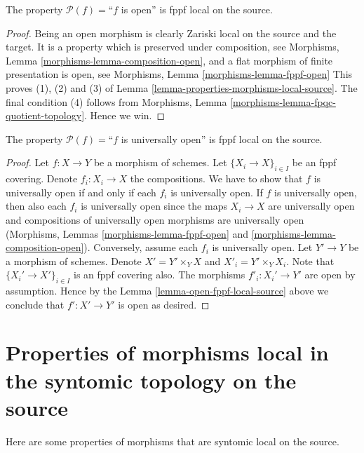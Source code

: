 \begin{lemma}
\label{lemma-open-fppf-local-source}
The property $\mathcal{P}(f)=$``$f$ is open''
is fppf local on the source.
\end{lemma}

\begin{proof}
Being an open morphism is clearly Zariski local on the source and the target.
It is a property which is preserved under composition, see
Morphisms, Lemma \ref{morphisms-lemma-composition-open}, and
a flat morphism of finite presentation is open, see
Morphisms, Lemma \ref{morphisms-lemma-fppf-open}
This proves
(1), (2) and (3) of Lemma \ref{lemma-properties-morphisms-local-source}.
The final condition (4) follows from
Morphisms, Lemma \ref{morphisms-lemma-fpqc-quotient-topology}.
Hence we win.
\end{proof}

\begin{lemma}
\label{lemma-universally-open-fppf-local-source}
The property $\mathcal{P}(f)=$``$f$ is universally open''
is fppf local on the source.
\end{lemma}

\begin{proof}
Let $f : X \to Y$ be a morphism of schemes.
Let $\{X_i \to X\}_{i \in I}$ be an fppf covering.
Denote $f_i : X_i \to X$ the compositions.
We have to show that $f$ is universally open if and only if
each $f_i$ is universally open. If $f$ is universally open,
then also each $f_i$ is universally open since the maps
$X_i \to X$ are universally open and compositions
of universally open morphisms are universally open
(Morphisms, Lemmas \ref{morphisms-lemma-fppf-open}
and \ref{morphisms-lemma-composition-open}).
Conversely, assume each $f_i$ is universally open.
Let $Y' \to Y$ be a morphism of schemes.
Denote $X' = Y' \times_Y X$ and $X'_i = Y' \times_Y X_i$.
Note that $\{X_i' \to X'\}_{i \in I}$ is an fppf covering also.
The morphisms $f'_i : X_i' \to Y'$ are open by assumption.
Hence by the Lemma \ref{lemma-open-fppf-local-source}
above we conclude that $f' : X' \to Y'$ is open as desired.
\end{proof}



\section{Properties of morphisms local in the syntomic topology on the source}
\label{section-syntomic-local-source}

\noindent
Here are some properties of morphisms that are syntomic local on the source.

